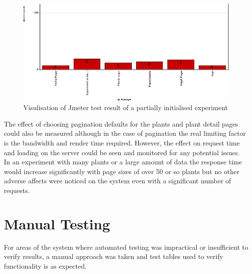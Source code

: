 \begin{figure}[H]
    \centering
    \includegraphics[width=\textwidth]{images/testing/jmeter_no_data_crop}
    \caption{Visulisation of Jmeter test result of a partially initialised experiment}
    \label{fig:jmeter_no_data}
\end{figure} 

The effect of choosing pagination defaults for the plants and plant detail pages could also be measured although in the case of pagination the real limiting factor is the bandwidth and render time required. However, the effect on request time and loading on the server could be seen and monitored for any potential issues. In an experiment with many plants or a large amount of data the response time would increase significantly with page sizes of over 50 or so plants but no other adverse affects were noticed on the system even with a significant number of requests.



\section{Manual Testing}
For areas of the system where automated testing was impractical or insufficient to verify results, a manual approach was taken and test tables used to verify functionality is as expected. 

